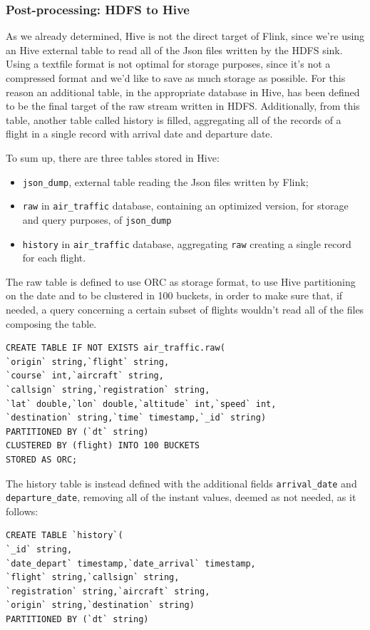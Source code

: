\subsubsection{Post-processing: HDFS to Hive}

As we already determined, Hive is not the direct target of Flink, since we're using an Hive external table to read all of the Json files written by the HDFS sink. Using a textfile format is not optimal for storage purposes, since it's not a compressed format and we'd like to save as much storage as possible. For this reason an additional table, in the appropriate database in Hive, has been defined to be the final target of the raw stream written in HDFS. Additionally, from this table, another table called history is filled, aggregating all of the records of a flight in a single record with arrival date and departure date.

To sum up, there are three tables stored in Hive:
\begin{itemize}
    \item \texttt{json\_dump}, external table reading the Json files written by Flink;
    \item \texttt{raw} in \texttt{air\_traffic} database, containing an optimized version, for storage and query purposes, of \texttt{json\_dump} 
    \item \texttt{history} in \texttt{air\_traffic} database, aggregating \texttt{raw} creating a single record for each flight.
\end{itemize}

The raw table is defined to use ORC as storage format, to use Hive partitioning on the date and to be clustered in 100 buckets, in order to make sure that, if needed, a query concerning a certain subset of flights wouldn't read all of the files composing the table.
\\
\begin{verbatim}
CREATE TABLE IF NOT EXISTS air_traffic.raw(
`origin` string,`flight` string,
`course` int,`aircraft` string,
`callsign` string,`registration` string,
`lat` double,`lon` double,`altitude` int,`speed` int,
`destination` string,`time` timestamp,`_id` string)
PARTITIONED BY (`dt` string)
CLUSTERED BY (flight) INTO 100 BUCKETS
STORED AS ORC;
\end{verbatim}

\pagebreak

The history table is instead defined with the additional fields \texttt{arrival\_date} and \texttt{departure\_date}, removing all of the instant values, deemed as not needed, as it follows:
\\
\begin{verbatim}
CREATE TABLE `history`(
`_id` string, 
`date_depart` timestamp,`date_arrival` timestamp, 
`flight` string,`callsign` string, 
`registration` string,`aircraft` string, 
`origin` string,`destination` string)
PARTITIONED BY (`dt` string)
\end{verbatim}

